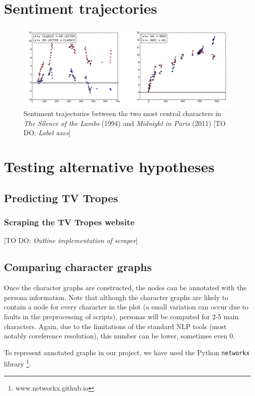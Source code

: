\documentclass[bsc,frontabs,singlespacing,parskip]{infthesis} %
\begin{document}
\section{Sentiment trajectories}

\begin{figure}[th!]
	\includegraphics[scale=0.335]{figures/sentiment}
	\caption{Sentiment trajectories between the two most central characters in \textit{The Silence of the Lambs} (1994) and \textit{Midnight in Paris} (2011) [TO DO: \textit{Label axes}]}
\end{figure}


\section{Testing alternative hypotheses}

\subsection{Predicting TV Tropes}
\subsubsection{Scraping the TV Tropes website}
[TO DO: \textit{Outline implementation of scraper}]

\subsection{Comparing character graphs}
Once the character graphs are constructed, the nodes can be annotated with the persona information. Note that although the character graphs are likely to contain a node for every character in the plot (a small variation can occur due to faults in the preprocessing of scripts), personas will be computed for 2-5 main characters. Again, due to the limitations of the standard NLP tools (most notably coreference resolution), this number can be lower, sometimes even 0.

To represent annotated graphs in our project, we have used the Python \texttt{networkx} library \footnote{www.networkx.github.io}.
\end{document}
